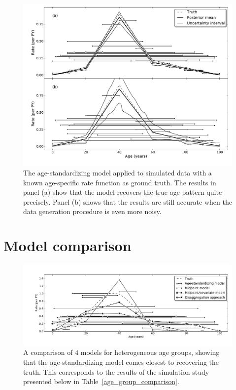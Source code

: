 \begin{figure}[h]
\begin{center}
\includegraphics[width=\textwidth]{age_group_standardize.pdf}
\caption{The age-standardizing model applied to simulated data with a
  known age-specific rate function as ground truth.  The results in
  panel (a) show that the model 
  recovers the true age pattern quite precisely. Panel (b) shows that the
  results are still accurate when the data generation procedure is
  even more noisy.}
\label{age-group-standardize}
\end{center}
\end{figure}


\section{Model comparison}


\begin{figure}[h]
\begin{center}
\includegraphics[width=\textwidth]{age_group_models.pdf}
\caption{A comparison of $4$ models for heterogeneous age groups, showing that the age-standardizing model comes closest to recovering the truth.  This corresponds to the results of the simulation study presented below in Table~\ref{age_group_comparison}.}
\label{age-group-model-comparison}
\end{center}
\end{figure}


